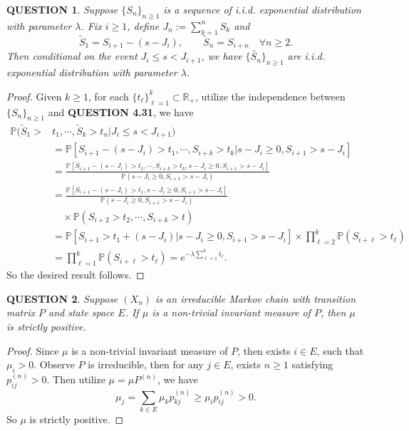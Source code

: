 \documentclass[12pt]{article}
\renewcommand{\(}{\left(}%
\renewcommand{\)}{\right)}%
\renewcommand{\[}{\left[}%
\renewcommand{\]}{\right]}%
\renewcommand{\r}{\mathbb{R}}
\newcommand{\p}{\mathbb{P}}
\newtheorem{question}{QUESTION}[section]}
\newtheorem{proof}{Proof.}}
\begin{document}
  \begin{question}
   Suppose $\{S_n\}_{n\geq 1}$ is a sequence of i.i.d. exponential distribution with parameter $\lambda$. Fix $i\geq 1$, define $J_n:=\sum_{k=1}^nS_k$ and
   \begin{equation*}
    \tilde{S}_1=S_{i+1}-(s-J_i),\qquad \tilde{S}_n=S_{i+n}\quad \forall n\geq 2.
   \end{equation*}
   Then conditional on the event $J_i\leq s<J_{i+1}$, we have $\{\tilde{S_n}\}_{n\geq 1}$ are i.i.d. exponential distribution with parameter $\lambda$.
  \end{question}
  \begin{proof}
   Given $k\geq 1$, for each $\{t_\ell\}_{\ell=1}^k\subset\r_+$, utilize the independence between $\{S_n\}_{n\geq 1}$ and {\bfseries QUESTION 4.31}, we have
   \begin{equation*}
    \begin{split}
     \p(\tilde{S}_1> &t_1,\cdots,\tilde{S}_k> t_n|J_i\leq s<J_{i+1})\\
     &=\p[S_{i+1}-(s-J_i)> t_1,\cdots,S_{i+k}> t_k|s-J_i\geq 0,S_{i+1}>s-J_i   ]\\
     &=\frac{\p[S_{i+1}-(s-J_i)> t_1,\cdots,S_{i+k}> t_k,s-J_i\geq 0,S_{i+1}>s-J_i]}{\p(s-J_i\geq 0,S_{i+1}>s-J_i )}\\
     &=\frac{\p[S_{i+1}-(s-J_i)> t_1,s-J_i\geq 0,S_{i+1}>s-J_i]}{\p(s-J_i\geq 0,S_{i+1}>s-J_i )}\\
     &\quad \times \p(S_{i+2}>t_2,\cdots,S_{i+k}> t )\\
     &=\p[S_{i+1}> t_1+(s-J_i)|s-J_i\geq 0,S_{i+1}>s-J_i]\times\prod_{\ell=2}^k\p(S_{i+\ell}>t_\ell)\\
     &=\prod_{\ell=1}^k\p(S_{i+\ell}>t_\ell)=e^{-\lambda\sum_{\ell=1}^k t_\ell}.
    \end{split}
   \end{equation*}
   So the desired result follows.
  \end{proof}

  \begin{question}
   Suppose $(X_n)$ is an irreducible Markov chain with transition matrix $P$ and state space $E$. If $\mu$ is a non-trivial invariant measure of $P$, then $\mu$ is strictly positive.
  \end{question}
  \begin{proof}
   Since $\mu$ is a non-trivial invariant measure of $P$, then exists $i\in E$, such that $\mu_i>0$. Observe $P$ is irreducible, then for any $j\in E$, exists $n\geq 1$ satisfying $p_{ij}^{(n)}>0$. Then utilize $\mu=\mu P^{(n)}$, we have
   \begin{equation*}
    \mu_j=\sum_{k\in E}\mu_k p_{kj}^{(n)}\geq \mu_i p_{ij}^{(n)}>0.
   \end{equation*}
   So $\mu$ is strictly positive.
  \end{proof}
\end{document}

